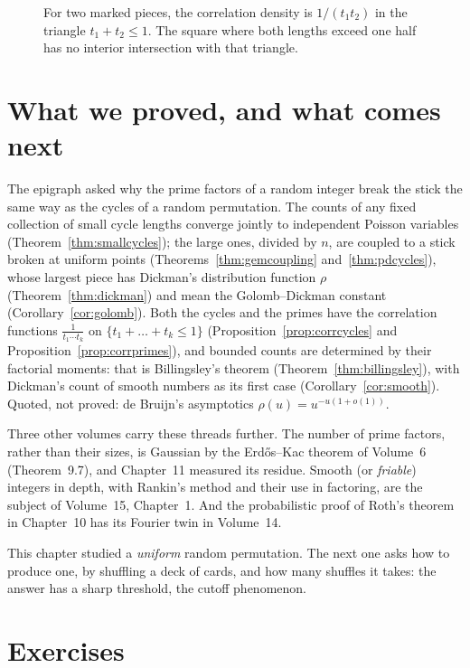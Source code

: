 \begin{figure}[ht]
\centering{}
\caption{For two marked pieces, the correlation density is $1/(t_1t_2)$ in the triangle $t_1+t_2\le1$. The square where both lengths exceed one half has no interior intersection with that triangle.}
\label{fig:v11-ch12-correlation-domain}
\end{figure}

\section{What we proved, and what comes next}

The epigraph asked why the prime factors of a random integer break the stick the same way as the cycles of a random permutation. The counts of any fixed collection of small cycle lengths converge jointly to independent Poisson variables (Theorem~\ref{thm:smallcycles}); the large ones, divided by $n$, are coupled to a stick broken at uniform points
(Theorems~\ref{thm:gemcoupling} and~\ref{thm:pdcycles}), whose largest piece has Dickman's distribution function $\rho$ (Theorem~\ref{thm:dickman}) and
mean the Golomb--Dickman constant (Corollary~\ref{cor:golomb}). Both the cycles and the primes have the correlation functions $\frac1{t_1\cdots t_k}$
on $\{t_1+\dots+t_k\le1\}$ (Proposition~\ref{prop:corrcycles} and Proposition~\ref{prop:corrprimes}), and bounded counts are determined by their
factorial moments: that is Billingsley's theorem (Theorem~\ref{thm:billingsley}), with Dickman's count of smooth numbers as its first case
(Corollary~\ref{cor:smooth}). Quoted, not proved: de Bruijn's asymptotics $\rho(u)=u^{-u(1+o(1))}$.

Three other volumes carry these threads further. The number of prime factors, rather than their sizes, is Gaussian by the Erd\H os--Kac theorem of
Volume~6 (Theorem~9.7), and Chapter~11 measured its residue. Smooth (or \emph{friable}) integers in depth, with Rankin's method and their use in
factoring, are the subject of Volume~15, Chapter~1. And the probabilistic proof of Roth's theorem in Chapter~10 has its Fourier twin in Volume~14.

This chapter studied a \emph{uniform} random permutation. The next one asks how to produce one, by shuffling a deck of cards, and how many shuffles
it takes: the answer has a sharp threshold, the cutoff phenomenon.

\section{Exercises}

